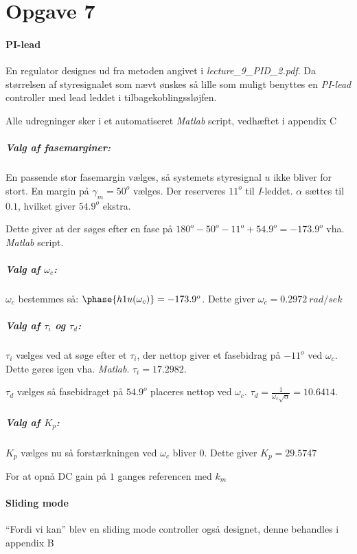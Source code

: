 \section{Opgave 7}
\paragraph{ PI-lead }
En regulator designes ud fra metoden angivet i \emph{lecture\_9\_PID\_2.pdf}. Da
størrelsen af styresignalet som nævt ønskes så lille som muligt benyttes en
\emph{PI-lead} controller med lead leddet i tilbagekoblingssløjfen.

Alle udregninger sker i et automatiseret \emph{Matlab} script, vedhæftet i appendix
C

\subparagraph{Valg af fasemarginer:}
	En passende stor fasemargin vælges, så systemets styresignal $u$ ikke bliver
	for stort. En margin på $\gamma_m = 50^o$ vælges.
	Der reserveres $11^o$ til \emph{I}-leddet.
	$\alpha$ sættes til $0.1$, hvilket giver $54.9^o$ ekstra.
	
	Dette giver at der søges efter en fase på $180^o - 50^o - 11^o + 54.9^o =
	-173.9^o$ vha. \emph{Matlab} script.
\subparagraph{Valg af $\omega_c$:}
	$\omega_c$ bestemmes så: $\phase{h1u(\omega_c)} = -173.9^o$. Dette giver
	$\omega_c =  0.2972~rad/sek$
\subparagraph{Valg af $\tau_i$ og $\tau_d$:}
	$\tau_i$ vælges ved at søge efter et $\tau_i$, der nettop giver et fasebidrag
	på $-11^o$ ved $\omega_c$. Dette gøres igen vha. \emph{Matlab}. $\tau_i =
	17.2982$.
	
	$\tau_d$ vælges så fasebidraget på $54.9^o$ placeres nettop ved $\omega_c$.
	$\tau_d = \frac{1}{\omega_c \sqrt{\alpha}} = 10.6414$.
\subparagraph{Valg af $K_p$:}
	$K_p$ vælges nu så forstærkningen ved $\omega_c$ bliver 0.
	Dette giver $K_p = 29.5747$
	
	For at opnå DC gain på $1$ ganges referencen med $k_m$
	
\paragraph{ Sliding mode }
	``Fordi vi kan'' blev en sliding mode controller også designet, denne
	behandles i appendix B
